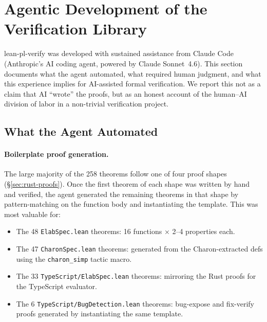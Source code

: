 
\section{Agentic Development of the Verification Library}
\label{sec:agentic}

lean-pl-verify was developed with sustained assistance from Claude Code
(Anthropic's AI coding agent, powered by Claude Sonnet~4.6).
This section documents what the agent automated, what required human judgment,
and what this experience implies for AI-assisted formal verification.
We report this not as a claim that AI ``wrote'' the proofs, but as an honest
account of the human--AI division of labor in a non-trivial verification project.

\subsection{What the Agent Automated}

\paragraph{Boilerplate proof generation.}
The large majority of the 258 theorems follow one of four proof shapes
(§\ref{sec:rust-proofs}).  Once the first theorem of each shape was written
by hand and verified, the agent generated the remaining theorems in that
shape by pattern-matching on the function body and instantiating the template.
This was most valuable for:

\begin{itemize}[leftmargin=2em]
  \item The 48 \texttt{ElabSpec.lean} theorems: 16 functions × 2--4 properties each.
  \item The 47 \texttt{CharonSpec.lean} theorems: generated from the
        Charon-extracted defs using the \texttt{charon\_simp} tactic macro.
  \item The 33 \texttt{TypeScript/ElabSpec.lean} theorems: mirroring the
        Rust proofs for the TypeScript evaluator.
  \item The 6 \texttt{TypeScript/BugDetection.lean} theorems: bug-expose and
        fix-verify proofs generated by instantiating the same \rfl template.
\end{itemize}

